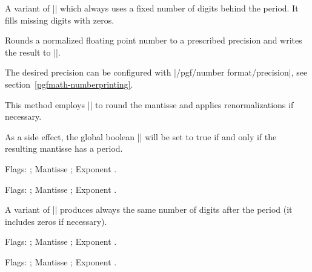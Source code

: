 \begin{command}{}
	A variant of |\pgfmathroundto| which always uses a fixed number of digits behind the period. It fills missing digits with zeros.
\begin{codeexample}[]
\pgfmathresult
\end{codeexample}
\begin{codeexample}[]
\pgfmathresult
\end{codeexample}
\begin{codeexample}[]
\pgfmathresult
\end{codeexample}
\end{command}

\begin{command}{}
	Rounds a normalized floating point number to a prescribed precision and writes the result to |\pgfmathresult|.

	The desired precision can be configured with |/pgf/number format/precision|, see section~\ref{pgfmath-numberprinting}. 
	
	This method employs |\pgfmathroundto| to round the mantisse and applies renormalizations if necessary.

	As a side effect, the global boolean |\ifpgfmathfloatroundhasperiod| will be set to true if and only if the resulting mantisse has a period.
\begin{codeexample}[]
\pgfmathfloatround{\pgfmathresult}
\pgfmathfloattomacro{\pgfmathresult}{\F}{\M}{\E}
Flags: \F; Mantisse \M; Exponent \E.
\end{codeexample}
\begin{codeexample}[]
\pgfmathfloatround{\pgfmathresult}
\pgfmathfloattomacro{\pgfmathresult}{\F}{\M}{\E}
Flags: \F; Mantisse \M; Exponent \E.
\end{codeexample}
\end{command}

\begin{command}{}
	A variant of |\pgfmathfloatround| produces always the same number of digits after the period (it includes zeros if necessary).
\begin{codeexample}[]
\pgfmathfloatroundzerofill{\pgfmathresult}
\pgfmathfloattomacro{\pgfmathresult}{\F}{\M}{\E}
Flags: \F; Mantisse \M; Exponent \E.
\end{codeexample}
\begin{codeexample}[]
\pgfmathfloatroundzerofill{\pgfmathresult}
\pgfmathfloattomacro{\pgfmathresult}{\F}{\M}{\E}
Flags: \F; Mantisse \M; Exponent \E.
\end{codeexample}
\end{command}

